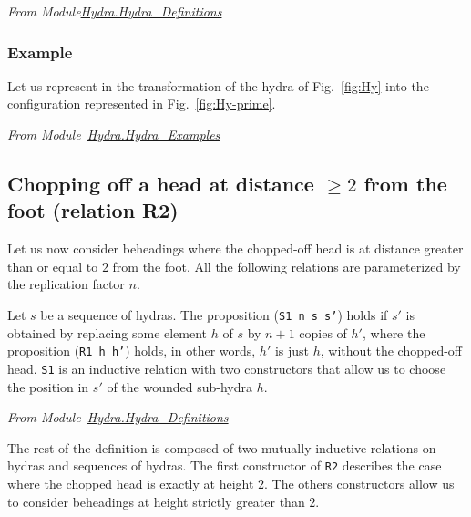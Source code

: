 \vspace{4pt}\emph{From Module\href{../theories/html/hydras.Hydra.Hydra_Definitions.html}{Hydra.Hydra\_Definitions}}





\subsubsection{Example}
\label{sec:orgheadline45}

Let us represent in \coq{}   the transformation of the hydra of Fig.~\vref{fig:Hy} into
the configuration represented in Fig.~\ref{fig:Hy-prime}.

\vspace{4pt}
\emph{From Module~\href{../theories/html/hydras.Hydra.Hydra_Examples.html}{Hydra.Hydra\_Examples}}





\subsection{Chopping off a head at distance \texorpdfstring{$\geq 2$}{>= 2} from the foot (relation R2) }


Let us now consider beheadings  where the chopped-off head is at distance greater than or equal to $2$ from the foot. All the following relations are parameterized by the replication factor  $n$.

 Let $s$ be a sequence of hydras. 
The proposition (\texttt{S1 n s s'}) holds if $s'$ is obtained by replacing some element $h$ of $s$ by 
$n+1$ copies of $h'$, where  the proposition (\texttt{R1 h h'}) holds, in other words, $h'$ is just $h$, without the chopped-off  head. \texttt{S1} is an inductive relation with two constructors that allow us to choose the position in $s'$ of the wounded sub-hydra $h$.

\vspace{4pt}
\noindent
\emph{From Module~\href{../theories/html/hydras.Hydra.Hydra_Definitions.html\#S1}{Hydra.Hydra\_Definitions}}




The rest of the definition is composed of two mutually inductive relations on hydras and sequences of hydras. The first constructor of \texttt{R2} describes the case where the chopped head is exactly at height $2$. The others constructors allow us to consider beheadings at height strictly greater than $2$.


